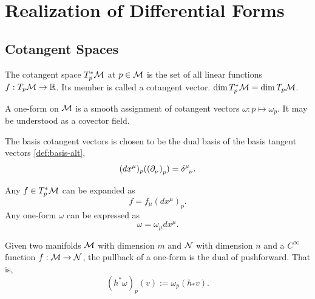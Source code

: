 \documentclass[../main.tex]{subfiles}
\begin{document}
    \section{Realization of Differential Forms}
    \subsection{Cotangent Spaces}
    \begin{definition}\label{def:cotangent-space}
        The cotangent space \(T_p^*\manifold[M]\) at \(p \in \manifold[M]\) is 
        the set of all linear functions \(f : T_p\manifold[M] \to \mathbb{R}\). 
        \newline
        Its member is called a cotangent vector. \newline
        \(\dim T_p^*\manifold[M]=\dim T_p\manifold[M]\).
    \end{definition}
    \begin{definition}\label{def:one-form}
        A one-form on \(\manifold[M]\) is a smooth assignment of cotangent 
        vectors \(\omega : p \mapsto \omega_p\). \newline
        It may be understood as a covector field.
    \end{definition}
    \begin{definition}\label{def:cotangent-basis}
        The basis cotangent vectors is chosen to be the dual basis of the 
        basis tangent vectors \cref{def:basis-alt}, 
        \[
        (dx^\mu)_p(\tvec{\nu}{p})=\delta\indices{^\mu_\nu}.
        \]
    \end{definition}
    \begin{theorem}\label{thm:cotangent-coordinates}
        Any \(f \in T_p^*\manifold[M]\) can be expanded as
        \[
        f = f_\mu (dx^\mu)_p.
        \]
        Any one-form \(\omega\) can be expressed as 
        \[
        \omega=\omega_\mu dx^\mu.
        \]
    \end{theorem}
    \newpage
    \begin{theorem}\label{thm:pullback-dual-pushforward}
        Given two manifolds \(\manifold[M]\) with dimension \(m\) and \(\manifold[N]\) 
        with dimension \(n\) and a \(C^\infty\) function \(f : \manifold[M] \to 
        \manifold[N]\), the pullback of a one-form is the dual of pushforward. 
        That is, 
        \[
        (h^*\omega)_p(v) := \omega_p(h_*v).
        \]
    \end{theorem}
\end{document}
